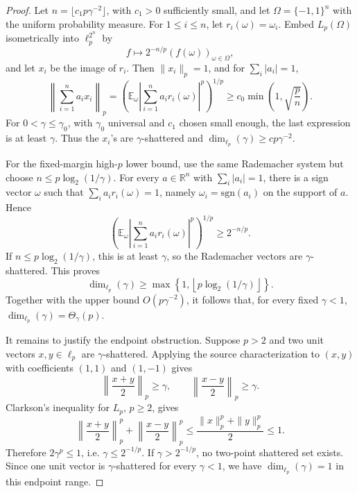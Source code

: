 \documentclass[11pt]{article}
\newcommand{\R}{\mathbb{R}}
\newcommand{\E}{\mathbb{E}}
\newcommand{\sgn}{\mathrm{sgn}}
\begin{document}
\begin{proof}
Let \(n=\lfloor c_1 p\gamma^{-2}\rfloor\), with \(c_1>0\) sufficiently small,
and let \(\Omega=\{-1,1\}^n\) with the uniform probability measure.  For
\(1\le i\le n\), let \(r_i(\omega)=\omega_i\).  Embed \(L_p(\Omega)\)
isometrically into \(\ell_p^{2^n}\) by
\[
 f\mapsto 2^{-n/p}(f(\omega))_{\omega\in\Omega},
\]
and let \(x_i\) be the image of \(r_i\).  Then \(\|x_i\|_p=1\), and for
\(\sum_i |a_i|=1\),
\[
 \left\|\sum_{i=1}^n a_i x_i\right\|_p
 =
 \left(\E_\omega\left|\sum_{i=1}^n a_i r_i(\omega)\right|^p\right)^{1/p}
 \ge c_0\min\left(1,\sqrt{\frac{p}{n}}\right).
\]
For \(0<\gamma\le\gamma_0\), with \(\gamma_0\) universal and \(c_1\) chosen
small enough, the last expression is at least \(\gamma\).  Thus the
\(x_i\)'s are \(\gamma\)-shattered and
\(\dim_{\ell_p}(\gamma)\ge c p\gamma^{-2}\).

For the fixed-margin high-\(p\) lower bound, use the same Rademacher system
but choose \(n\le p\log_2(1/\gamma)\).  For every \(a\in\R^n\) with
\(\sum_i |a_i|=1\), there is a sign vector \(\omega\) such that
\(\sum_i a_i r_i(\omega)=1\), namely \(\omega_i=\sgn(a_i)\) on the support of
\(a\).  Hence
\[
 \left(\E_\omega\left|\sum_{i=1}^n a_i r_i(\omega)\right|^p\right)^{1/p}
 \ge 2^{-n/p}.
\]
If \(n\le p\log_2(1/\gamma)\), this is at least \(\gamma\), so the
Rademacher vectors are \(\gamma\)-shattered.  This proves
\[
 \dim_{\ell_p}(\gamma)\ge
 \max\left\{1,\left\lfloor p\log_2(1/\gamma)\right\rfloor\right\}.
\]
Together with the upper bound \(O(p\gamma^{-2})\), it follows that, for every
fixed \(\gamma<1\), \(\dim_{\ell_p}(\gamma)=\Theta_\gamma(p)\).

It remains to justify the endpoint obstruction.  Suppose \(p>2\) and two unit
vectors \(x,y\in\ell_p\) are \(\gamma\)-shattered.  Applying the source
characterization to \((x,y)\) with coefficients \((1,1)\) and \((1,-1)\)
gives
\[
  \left\|\frac{x+y}{2}\right\|_p\ge\gamma,
  \qquad
  \left\|\frac{x-y}{2}\right\|_p\ge\gamma.
\]
Clarkson's inequality for \(L_p\), \(p\ge2\), gives
\[
 \left\|\frac{x+y}{2}\right\|_p^p
 +
 \left\|\frac{x-y}{2}\right\|_p^p
 \le
 \frac{\|x\|_p^p+\|y\|_p^p}{2}
 \le1.
\]
Therefore \(2\gamma^p\le1\), i.e. \(\gamma\le2^{-1/p}\).  If
\(\gamma>2^{-1/p}\), no two-point shattered set exists.  Since one unit
vector is \(\gamma\)-shattered for every \(\gamma<1\), we have
\(\dim_{\ell_p}(\gamma)=1\) in this endpoint range.


\end{proof}
\end{document}
